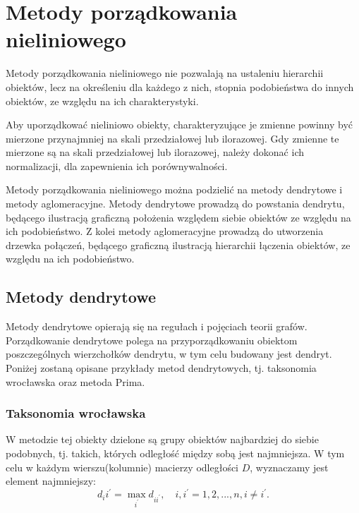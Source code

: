 \documentclass[12pt,a4paper]{report}
\begin{document}
\newpage
\section{Metody porządkowania nieliniowego}
\noindent

Metody porządkowania nieliniowego nie pozwalają na ustaleniu hierarchii obiektów, lecz na określeniu dla każdego z nich, stopnia podobieństwa do innych obiektów, ze względu na ich charakterystyki. 

Aby uporządkować nieliniowo obiekty, charakteryzujące je zmienne powinny być mierzone przynajmniej na skali przedziałowej lub ilorazowej. Gdy zmienne te mierzone są na skali przedziałowej lub ilorazowej, należy dokonać ich normalizacji, dla zapewnienia ich porównywalności.

Metody porządkowania nieliniowego można podzielić na metody dendrytowe i metody aglomeracyjne. Metody dendrytowe prowadzą do powstania dendrytu, będącego ilustracją graficzną  położenia względem siebie obiektów ze względu na ich podobieństwo. Z kolei metody aglomeracyjne prowadzą do utworzenia drzewka połączeń, będącego graficzną ilustracją hierarchii łączenia obiektów, ze względu na ich podobieństwo.

\subsection{Metody dendrytowe}
\noindent 

Metody dendrytowe opierają się na regułach i pojęciach teorii grafów. Porządkowanie dendrytowe polega na przyporządkowaniu obiektom poszczególnych wierzchołków dendrytu, w tym celu budowany jest dendryt. Poniżej zostaną opisane przykłady metod dendrytowych, tj. taksonomia wrocławska oraz metoda Prima. 

\subsubsection{Taksonomia wrocławska}
\noindent


W metodzie tej obiekty dzielone są grupy obiektów najbardziej do siebie podobnych, tj. takich, których odległość między sobą jest najmniejsza. W tym celu w każdym wierszu(kolumnie) macierzy odległości $D$, wyznaczamy jest element najmniejszy: 
\begin{equation}
d_ii^{'}= \max\limits_{i^{'}} {d_{ii^{'}}}, \quad i,i^{'}=1,2,...,n, i\neq i^{'}.
\end{equation}
\end{document}
